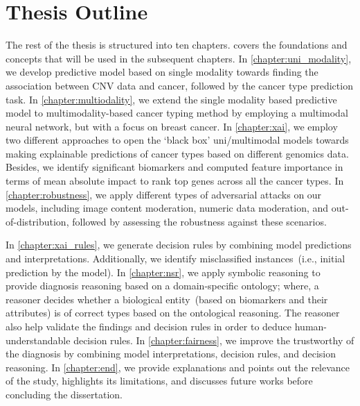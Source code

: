 \section{Thesis Outline} \label{structure}
The rest of the thesis is structured into ten chapters. 
 covers the foundations and concepts that will be used in the subsequent chapters. In \cref{chapter:uni_modality}, we develop predictive model based on single modality towards finding the association between CNV data and cancer, followed by the cancer type prediction task. In \cref{chapter:multiodality}, we extend the single modality based predictive model to multimodality-based cancer typing method by employing a multimodal neural network, but with a focus on breast cancer. In \cref{chapter:xai}, we employ two different approaches to open the `black box' uni/multimodal models towards making explainable predictions of cancer types based on different genomics data. Besides, we identify significant biomarkers and computed feature importance in terms of mean absolute impact to rank top genes across all the cancer types. In \cref{chapter:robustness}, we apply different types of adversarial attacks on our models, including image content moderation, numeric data moderation, and out-of-distribution, followed by assessing the robustness against these scenarios. 

\hspace*{3.5mm} In \cref{chapter:xai_rules}, we generate decision rules by combining model predictions and interpretations. Additionally, we identify  misclassified instances~(i.e., initial prediction by the model). In \cref{chapter:nsr}, we apply symbolic reasoning to provide diagnosis reasoning based on a domain-specific ontology; where, a reasoner decides whether a biological entity~(based on biomarkers and their attributes) is of correct types based on the ontological reasoning. The reasoner also help validate the findings and decision rules in order to deduce human-understandable decision rules. In \cref{chapter:fairness}, we improve the trustworthy of the diagnosis by combining model interpretations, decision rules, and decision reasoning. In \cref{chapter:end}, we provide explanations and points out the relevance of the study, highlights its limitations, and discusses future works before concluding the dissertation. 

